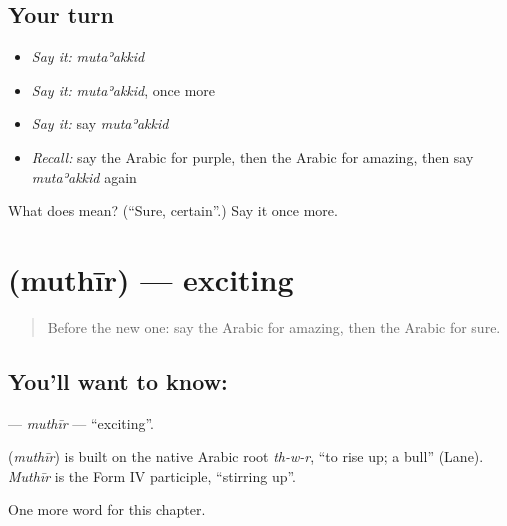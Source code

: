 \subsection*{Your turn}
\begin{itemize}
\raggedright
  \item \emph{Say it:} \emph{mutaʾakkid}
  \item \emph{Say it:} \emph{mutaʾakkid}, once more
  \item \emph{Say it:} say \emph{mutaʾakkid}
  \item \emph{Recall:} say the Arabic for purple, then the Arabic for amazing, then say \emph{mutaʾakkid} again
\end{itemize}

\begin{tcolorbox}[breakable,colback=teal!4,colframe=teal!35!black,title={Before you move on}]
What does  mean? (\textquotedblleft{}Sure, certain\textquotedblright{}.) Say it once more.
\end{tcolorbox}
\section[\texorpdfstring{\ar{مثير} (muthīr)}{مثير (muthīr)}]{ (muthīr) — exciting}

\label{lesson:AR-C272-muthir}



\begin{quote}
Before the new one: say the Arabic for amazing, then the Arabic for sure.
\end{quote}

\subsection*{You'll want to know: }
\textbf{} — \emph{muthīr} — \textquotedblleft{}exciting\textquotedblright{}.

\begin{cousinweb}
\textbf{} (\emph{muthīr}) is built on the native Arabic root \emph{th-w-r}, \textquotedblleft{}to rise up; a bull\textquotedblright{} (Lane). \emph{Muthīr} is the Form IV participle, \textquotedblleft{}stirring up\textquotedblright{}.
\end{cousinweb}

\begin{grammarlens}[title={What you've built}]
One more word for this chapter.
\end{grammarlens}

